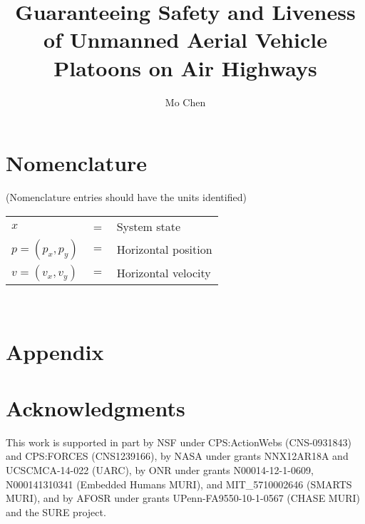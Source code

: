 \documentclass[journal]{aiaa-pretty}
\author{Mo Chen}
\title{Guaranteeing Safety and Liveness of Unmanned Aerial Vehicle Platoons on Air Highways}
\newcommand{\pos}{p} %
\newcommand{\vel}{v} %
\begin{document}
\maketitle

\section*{Nomenclature}
(Nomenclature entries should have the units identified)\\
\noindent\begin{tabular}{@{}lcl@{}}
$x$ &=& System state \\
$\pos=(\pos_x, \pos_y)$ &$=$& Horizontal position \\
$\vel=(\vel_x, \vel_y)$ &$=$& Horizontal velocity
\end{tabular} \\














\section*{Appendix}

\section*{Acknowledgments}
This work is supported in part by NSF under CPS:ActionWebs (CNS-0931843) and CPS:FORCES (CNS1239166), by NASA under grants NNX12AR18A and UCSCMCA-14-022 (UARC), by ONR under grants N00014-12-1-0609, N000141310341 (Embedded Humans MURI), and MIT\_5710002646 (SMARTS MURI), and by AFOSR under grants UPenn-FA9550-10-1-0567 (CHASE MURI) and the SURE project.


\end{document}
